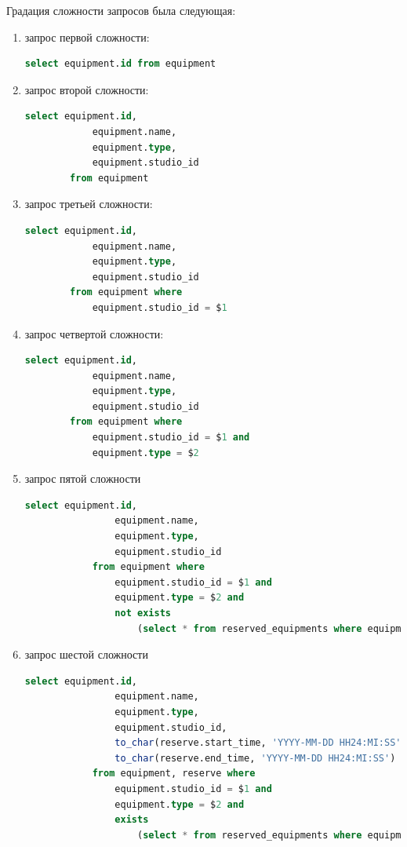 Градация сложности запросов была следующая:
\begin{enumerate}
	\item запрос первой сложности:
		\begin{lstlisting}[language=sql, label=lst:query_1]
		select equipment.id from equipment\end{lstlisting}
	\item запрос второй сложности:
		\begin{lstlisting}[language=sql, label=lst:query_2]
		select equipment.id,
			equipment.name,
			equipment.type,
			equipment.studio_id
		from equipment\end{lstlisting}
	\item запрос третьей сложности:
		\begin{lstlisting}[language=sql, label=lst:query_2]
		select equipment.id,
			equipment.name,
			equipment.type,
			equipment.studio_id
		from equipment where 
			equipment.studio_id = $1\end{lstlisting}
	\item запрос четвертой сложности:
		\begin{lstlisting}[language=sql, label=lst:query_2]
		select equipment.id,
			equipment.name,
			equipment.type,
			equipment.studio_id
		from equipment where 
			equipment.studio_id = $1 and
			equipment.type = $2\end{lstlisting}
	\item запрос пятой сложности
			\begin{lstlisting}[language=sql, label=lst:query_2]
			select equipment.id,
				equipment.name,
				equipment.type,
				equipment.studio_id
			from equipment where 
				equipment.studio_id = $1 and
				equipment.type = $2 and 
				not exists
					(select * from reserved_equipments where equipment.id = reserved_equipments.equipment_id)\end{lstlisting}
	\item запрос шестой сложности
			\begin{lstlisting}[language=sql, label=lst:query_2]
			select equipment.id, 
				equipment.name,
				equipment.type,
				equipment.studio_id,
				to_char(reserve.start_time, 'YYYY-MM-DD HH24:MI:SS'),
				to_char(reserve.end_time, 'YYYY-MM-DD HH24:MI:SS')
			from equipment, reserve where 
				equipment.studio_id = $1 and 
				equipment.type = $2 and 
				exists 
					(select * from reserved_equipments where equipment.id = reserved_equipments.equipment_id)\end{lstlisting}
\end{enumerate}  

